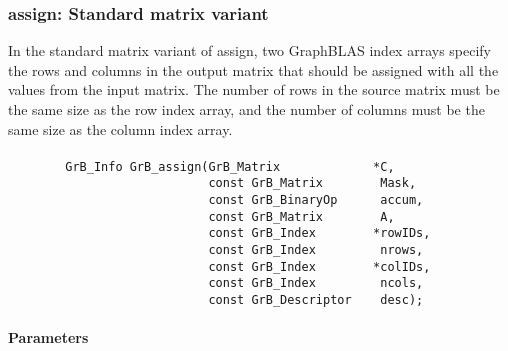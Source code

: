 \subsubsection{{\sf assign}: Standard matrix variant}

In the standard matrix variant of {\sf assign}, two GraphBLAS index arrays 
specify the rows and columns in the output matrix that should be assigned
with all the values from the input matrix.  The number of rows in the source
matrix must be the same size as the row index array, and the number of columns
must be the same size as the column index array.

\paragraph{\syntax}

\begin{verbatim}
        GrB_Info GrB_assign(GrB_Matrix             *C,
                            const GrB_Matrix        Mask,
                            const GrB_BinaryOp      accum,
                            const GrB_Matrix        A,
                            const GrB_Index        *rowIDs,
                            const GrB_Index         nrows,
                            const GrB_Index        *colIDs,
                            const GrB_Index         ncols,
                            const GrB_Descriptor    desc);
\end{verbatim}

\paragraph{Parameters}

